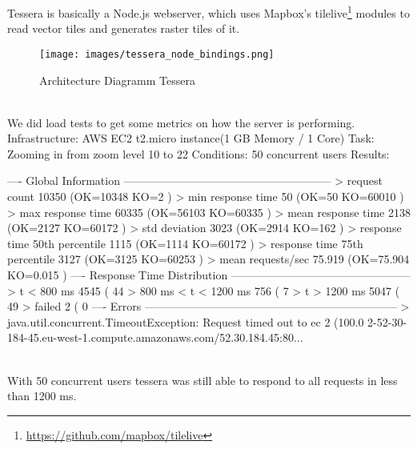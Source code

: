 Tessera is basically a Node.js webserver, which uses Mapbox's tilelive\footnote{\url{https://github.com/mapbox/tilelive}} modules to read vector tiles and generates raster tiles of it.
\begin{figure}[H]
  \texttt{[image: images/tessera\_node\_bindings.png]}
  \caption{Architecture Diagramm Tessera}
\end{figure}\\
We did load tests to get some metrics on how the server is performing.
\\
Infrastructure: AWS EC2 t2.micro instance(1 GB Memory / 1 Core)
Task: Zooming in from zoom level 10 to 22
Conditions: 50 concurrent users
Results:
\begin{bashcode}
---- Global Information --------------------------------------------------------
> request count                                      10350 (OK=10348  KO=2     )
> min response time                                     50 (OK=50     KO=60010 )
> max response time                                  60335 (OK=56103  KO=60335 )
> mean response time                                  2138 (OK=2127   KO=60172 )
> std deviation                                       3023 (OK=2914   KO=162   )
> response time 50th percentile                       1115 (OK=1114   KO=60172 )
> response time 75th percentile                       3127 (OK=3125   KO=60253 )
> mean requests/sec                                 75.919 (OK=75.904 KO=0.015 )
---- Response Time Distribution ------------------------------------------------
> t < 800 ms                                          4545 ( 44%
> 800 ms < t < 1200 ms                                 756 (  7%
> t > 1200 ms                                         5047 ( 49%
> failed                                                 2 (  0%
---- Errors --------------------------------------------------------------------
> java.util.concurrent.TimeoutException: Request timed out to ec      2 (100.0%
2-52-30-184-45.eu-west-1.compute.amazonaws.com/52.30.184.45:80...
\end{bashcode} \\

With 50 concurrent users tessera was still able to respond to all requests in less than 1200 ms.

